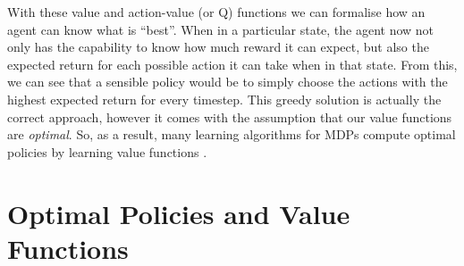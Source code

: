 With these value and action-value (or Q) functions we can formalise how an agent can know what is ``best''. When in a particular state, the agent now not only has the capability to know how much reward it can expect, but also the expected return for each possible action it can take when in that state.
From this, we can see that a sensible policy would be to simply choose the actions with the highest expected return for every timestep. This greedy solution is actually the correct approach, however it comes with the assumption that our value functions are \textit{optimal}. So, as a result, many learning algorithms for MDPs compute optimal policies by learning value functions \cite{TTK23}.


\section{Optimal Policies and Value Functions}
\label{sec:2_optimalPoliciesValueFunc}

